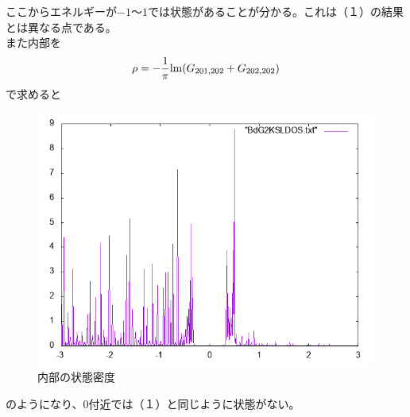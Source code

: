 \documentclass{jarticle}
\begin{document}
ここからエネルギーが$-1$〜$1$では状態があることが分かる。これは（１）の結果とは異なる点である。\\
また内部を
\begin{align}
\rho=-\dfrac{1}{\pi}{\rm lm}(G_{201,202}+G_{202,202})			
\end{align}
で求めると
\begin{figure}[H]
	\centering
	\includegraphics[scale=0.5]{BdGKSLDOSinternal.png}
	\caption{内部の状態密度}
\end{figure}
のようになり、$0$付近では（１）と同じように状態がない。
\end{document}
